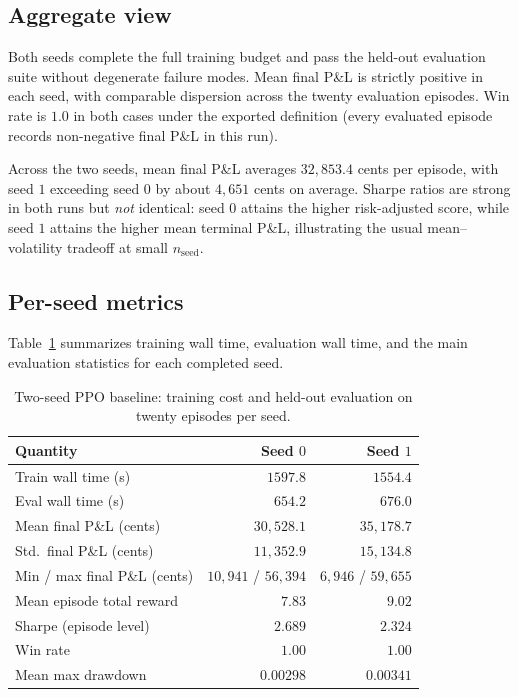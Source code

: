 \documentclass[11pt]{article}
\begin{document}
\subsection{Aggregate view}

Both seeds complete the full training budget and pass the held-out evaluation suite without
degenerate failure modes. Mean final P\&L is strictly positive in each seed, with comparable
dispersion across the twenty evaluation episodes. Win rate is $1.0$ in both cases under the
exported definition (every evaluated episode records non-negative final P\&L in this run).

Across the two seeds, mean final P\&L averages $32{,}853.4$ cents per episode, with seed $1$
exceeding seed $0$ by about $4{,}651$ cents on average. Sharpe ratios are strong in both runs but
\emph{not} identical: seed $0$ attains the higher risk-adjusted score, while seed $1$ attains the
higher mean terminal P\&L, illustrating the usual mean--volatility tradeoff at small $n_{\text{seed}}$.

\subsection{Per-seed metrics}

Table~\ref{tab:two-seed} summarizes training wall time, evaluation wall time, and the main
evaluation statistics for each completed seed.

\begin{table}[h]
\centering
\begin{tabular}{lrr}
\toprule
\textbf{Quantity} & \textbf{Seed $0$} & \textbf{Seed $1$} \\
\midrule
Train wall time (s) & $1597.8$ & $1554.4$ \\
Eval wall time (s) & $654.2$ & $676.0$ \\
Mean final P\&L (cents) & $30{,}528.1$ & $35{,}178.7$ \\
Std.\ final P\&L (cents) & $11{,}352.9$ & $15{,}134.8$ \\
Min / max final P\&L (cents) & $10{,}941$ / $56{,}394$ & $6{,}946$ / $59{,}655$ \\
Mean episode total reward & $7.83$ & $9.02$ \\
Sharpe (episode level) & $2.689$ & $2.324$ \\
Win rate & $1.00$ & $1.00$ \\
Mean max drawdown & $0.00298$ & $0.00341$ \\
\bottomrule
\end{tabular}
\caption{Two-seed PPO baseline: training cost and held-out evaluation on twenty episodes per seed.}
\label{tab:two-seed}
\end{table}
\end{document}
